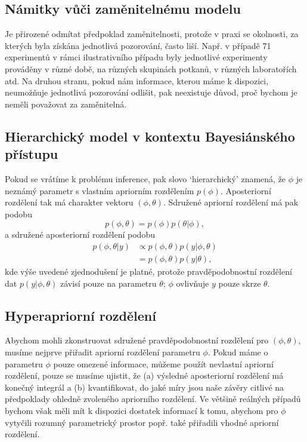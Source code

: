 \subsection{Námitky vůči zaměnitelnému modelu}

Je přirozené odmítat předpoklad zaměnitelnosti, protože v praxi se okolnosti, za kterých byla získána jednotlivá pozorování, často liší. Např. v případě 71 experimentů v rámci ilustrativního případu byly jednotlivé experimenty prováděny v různé době, na různých skupinách potkanů, v různých laboratořích atd. Na druhou stranu, pokud nám informace, kterou máme k dispozici, neumožňuje jednotlivá pozorování odlišit, pak neexistuje důvod, proč bychom je neměli považovat za zaměnitelná.

\subsection{Hierarchický model v kontextu Bayesiánského přístupu}

Pokud se vrátíme k problému inference, pak slovo `hierarchický' znamená, že $\phi$ je neznámý parametr s vlastním apriorním rozdělením $p(\phi)$. Aposteriorní rozdělení tak má charakter vektoru $(\phi, \theta)$. Sdružené apriorní rozdělení má pak podobu
\begin{equation}
p(\phi, \theta) = p(\phi) p(\theta | \phi),
\end{equation}
a sdružené aposteriorní rozdělení podobu
\begin{equation}
\begin{split}
p(\phi, \theta|y) & \varpropto p(\phi, \theta) p(y|\phi, \theta)\\
 & = p(\phi, \theta) p(y | \theta),
\end{split}
\end{equation}
kde výše uvedené zjednodušení je platné, protože pravděpodobnostní rozdělení dat $p(y|\phi, \theta)$ závisí pouze na parametru $\theta$; $\phi$ ovlivňuje $y$ pouze skrze $\theta$.

\subsection{Hyperapriorní rozdělení}

Abychom mohli zkonstruovat sdružené pravděpodobnostní rozdělení pro $(\phi, \theta)$, musíme nejprve přiřadit apriorní rozdělení parametru $\phi$. Pokud máme o parametru $\phi$ pouze omezené informace, můžeme použít nevlastní apriorní rozdělení, pouze se musíme ujistit, že (a) výsledné aposteriorní rozdělení má konečný integrál a (b) kvantifikovat, do jaké míry jsou naše závěry citlivé na předpoklady ohledně zvoleného apriorního rozdělení. Ve většině reálných případů bychom však měli mít k dispozici dostatek informací k tomu, abychom pro $\phi$ vytyčili rozumný parametrický prostor popř. také přiřadili vhodné apriorní rozdělení.

